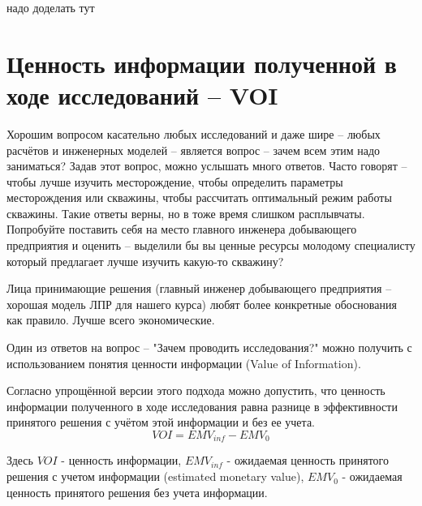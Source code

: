 надо доделать тут

\section{Ценность информации полученной в ходе исследований -- VOI}

Хорошим вопросом касательно любых исследований и даже шире -- любых расчётов и инженерных моделей -- является вопрос -- зачем всем этим надо заниматься? Задав этот вопрос, можно услышать много ответов. Часто говорят -- чтобы лучше изучить месторождение, чтобы определить параметры месторождения или скважины, чтобы рассчитать оптимальный режим работы скважины. Такие ответы верны, но в тоже время слишком расплывчаты. Попробуйте поставить себя на место главного инженера добывающего предприятия и оценить -- выделили бы вы ценные ресурсы молодому специалисту который предлагает лучше изучить какую-то скважину? 

Лица принимающие решения (главный инженер добывающего предприятия -- хорошая модель ЛПР для нашего курса) любят более конкретные обоснования как правило. Лучше всего экономические.

Один из ответов на вопрос -- "Зачем проводить исследования?" можно получить с использованием понятия ценности информации (Value of Information). 


Согласно упрощённой версии этого подхода можно допустить, что ценность информации полученного в ходе исследования равна разнице в эффективности принятого решения с учётом этой информации и без ее учета. 
$$VOI = EMV_{inf}-EMV_{0}$$

Здесь $VOI$ - ценность информации, $EMV_{inf}$ - ожидаемая ценность принятого решения с учетом информации (estimated monetary value), $EMV_{0}$ - ожидаемая ценность принятого решения без учета информации.

